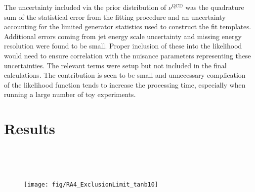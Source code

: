 The uncertainty included via the prior distribution of $\nu^{\textrm{QCD}}$ was
the quadrature sum of the statistical error from the fitting procedure and an
uncertainty accounting for the limited generator statistics used to construct
the fit templates. Additional errors coming from jet energy scale uncertainty
and missing energy resolution were found to be small. Proper inclusion of these
into the likelihood would need to ensure correlation with the nuisance
parameters representing these uncertainties. The relevant terms were setup but
not included in the final calculations. The contribution is seen to be small and
unnecessary complication of the likelihood function tends to increase the
processing time, especially when running a large number of toy experiments.


\section{Results}
\begin{figure}
\centering
{}\quad
{}\\
\quad
{}
\caption[]{}
\label{fig:inter_t2tt_mu}
\end{figure}

\begin{figure}
\centering
{}\quad
{}\\
\quad
{}
\caption[]{}
\label{fig:inter_t2tt_el}
\end{figure}

\begin{figure}
\texttt{[image: fig/RA4\_ExclusionLimit\_tanb10]}
\end{figure}

